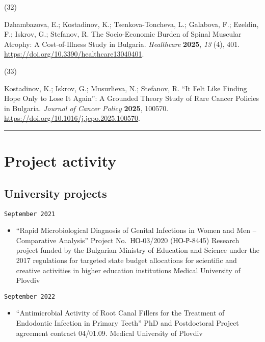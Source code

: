 \documentclass[
  12pt,
  letterpaper,
  DIV=11,
  numbers=noendperiod]{scrartcl}
\providecommand{\tightlist}{%
  \setlength{\itemsep}{0pt}\setlength{\parskip}{0pt}}\usepackage{longtable,booktabs,array}
\newlength{\cslhangindent}
\newlength{\csllabelwidth}
\newenvironment{CSLReferences}[2] %
 {\begin{list}{}{%
  \setlength{\itemindent}{0pt}
  \setlength{\leftmargin}{0pt}
  \setlength{\parsep}{0pt}
  \ifodd #1
   \setlength{\leftmargin}{\cslhangindent}
   \setlength{\itemindent}{-1\cslhangindent}
  \fi
  \setlength{\itemsep}{#2\baselineskip}}}
 {\end{list}}
\newcommand{\CSLLeftMargin}[1]{\parbox[t]{\csllabelwidth}{\strut#1\strut}}
\newcommand{\CSLRightInline}[1]{\parbox[t]{\linewidth - \csllabelwidth}{\strut#1\strut}}
\begin{document}
\begin{CSLReferences}{0}{0}
\CSLLeftMargin{(32) }%
\CSLRightInline{Dzhambazova, E.; Kostadinov, K.; Tsenkova-Toncheva, L.;
Galabova, F.; Ezeldin, F.; Iskrov, G.; Stefanov, R. The Socio-Economic
Burden of Spinal Muscular Atrophy: A Cost-of-Illness Study in Bulgaria.
\emph{Healthcare} \textbf{2025}, \emph{13} (4), 401.
\url{https://doi.org/10.3390/healthcare13040401}.}

\CSLLeftMargin{(33) }%
\CSLRightInline{Kostadinov, K.; Iskrov, G.; Musurlieva, N.; Stefanov, R.
{``It Felt Like Finding Hope Only to Lose It Again''}: A Grounded Theory
Study of Rare Cancer Policies in Bulgaria. \emph{Journal of Cancer
Policy} \textbf{2025}, 100570.
\url{https://doi.org/10.1016/j.jcpo.2025.100570}.}

\end{CSLReferences}

\begin{center}\rule{0.5\linewidth}{0.5pt}\end{center}

\section{Project activity}\label{project-activity}

\subsection{University projects}\label{university-projects}

\texttt{September\ 2021}

\begin{itemize}
\tightlist
\item
  ``Rapid Microbiological Diagnosis of Genital Infections in Women and
  Men -- Comparative Analysis'' \textbar{} Project No.~НО-03/2020
  (НО-Р-8445) \textbar{} Research project funded by the Bulgarian
  Ministry of Education and Science under the 2017 regulations for
  targeted state budget allocations for scientific and creative
  activities in higher education institutions \textbar{} Medical
  University of Plovdiv
\end{itemize}

\texttt{September\ 2022}

\begin{itemize}
\tightlist
\item
  ``Antimicrobial Activity of Root Canal Fillers for the Treatment of
  Endodontic Infection in Primary Teeth'' \textbar{} PhD and
  Postdoctoral Project \textbar{} agreement contract 04/01.09.
  \textbar{} Medical University of Plovdiv
\end{itemize}
\end{document}
